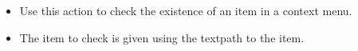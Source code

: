 
\begin{itemize}
\item Use this action to check the existence of an item in a context menu.
\item The item to check is given using the textpath to the item.
\end{itemize}

